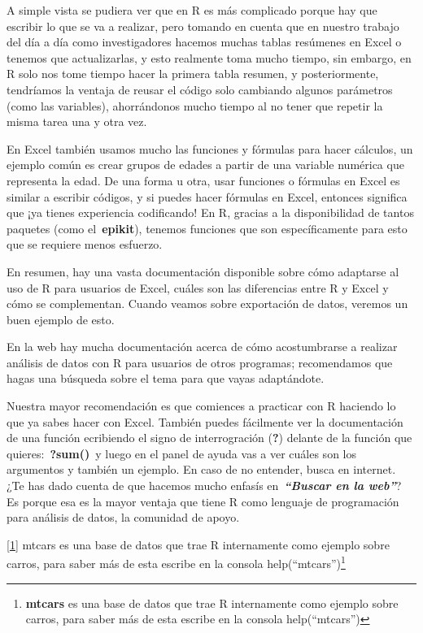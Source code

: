 \documentclass[
  letterpaper,
  DIV=11,
  numbers=noendperiod]{scrreprt}
\begin{document}
A simple vista se pudiera ver que en R es más complicado porque hay que
escribir lo que se va a realizar, pero tomando en cuenta que en nuestro
trabajo del día a día como investigadores hacemos muchas tablas
resúmenes en Excel o tenemos que actualizarlas, y esto realmente toma
mucho tiempo, sin embargo, en R solo nos tome tiempo hacer la primera
tabla resumen, y posteriormente, tendríamos la ventaja de reusar el
código solo cambiando algunos parámetros (como las variables),
ahorrándonos mucho tiempo al no tener que repetir la misma tarea una y
otra vez.

En Excel también usamos mucho las funciones y fórmulas para hacer
cálculos, un ejemplo común es crear grupos de edades a partir de una
variable numérica que representa la edad. De una forma u otra, usar
funciones o fórmulas en Excel es similar a escribir códigos, y si puedes
hacer fórmulas en Excel, entonces significa que ¡ya tienes experiencia
codificando! En R, gracias a la disponibilidad de tantos paquetes (como
el~\textbf{epikit}), tenemos funciones que son específicamente para esto
que se requiere menos esfuerzo.

En resumen, hay una vasta documentación disponible sobre cómo adaptarse
al uso de R para usuarios de Excel, cuáles son las diferencias entre R y
Excel y cómo se complementan. Cuando veamos sobre exportación de datos,
veremos un buen ejemplo de esto.

En la web hay mucha documentación acerca de cómo acostumbrarse a
realizar análisis de datos con R para usuarios de otros programas;
recomendamos que hagas una búsqueda sobre el tema para que vayas
adaptándote.

Nuestra mayor recomendación es que comiences a practicar con R haciendo
lo que ya sabes hacer con Excel. También puedes fácilmente ver la
documentación de una función ecribiendo el signo de interrogración
(\textbf{?}) delante de la función que quieres:~\textbf{?sum()}~y luego
en el panel de ayuda vas a ver cuáles son los argumentos y también un
ejemplo. En caso de no entender, busca en internet. ¿Te has dado cuenta
de que hacemos mucho enfasís en~\textbf{\emph{``Buscar en la web''}}? Es
porque esa es la mayor ventaja que tiene R como lenguaje de programación
para análisis de datos, la comunidad de apoyo.

\hyperref[_ftnref1]{{[}1{]}} mtcars es una base de datos que trae R
internamente como ejemplo sobre carros, para saber más de esta escribe
en la consola help(``mtcars'')\footnote{\textbf{mtcars} es una base de
  datos que trae R internamente como ejemplo sobre carros, para saber
  más de esta escribe en la consola help(``mtcars'')}
\end{document}
